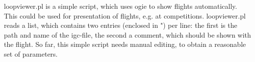 loopviewer.pl is a simple script, which uses ogie to show flights automatically.
This could be used for presentation of flights, e.g. at competitions.
loopviewer.pl reads a list, which contains two entries (enclosed in ") per line:
the first is the path and name of the igc-file, the second a comment, which should be shown with the flight.
So far, this simple script needs manual editing, to obtain a reasonable set of parameters.






